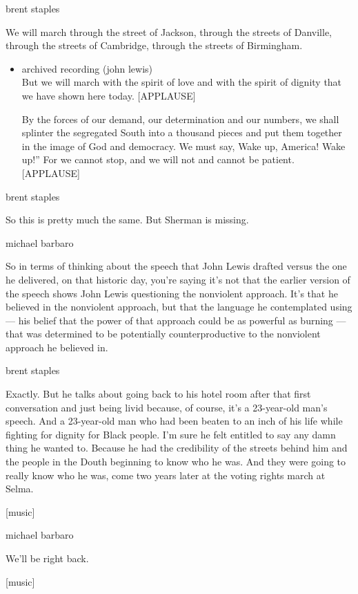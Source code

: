 brent staples

We will march through the street of Jackson, through the streets of
Danville, through the streets of Cambridge, through the streets of
Birmingham.

\begin{itemize}
\item
  archived recording (john lewis)\\
  But we will march with the spirit of love and with the spirit of
  dignity that we have shown here today. {[}APPLAUSE{]}

  By the forces of our demand, our determination and our numbers, we
  shall splinter the segregated South into a thousand pieces and put
  them together in the image of God and democracy. We must say, Wake up,
  America! Wake up!'' For we cannot stop, and we will not and cannot be
  patient. {[}APPLAUSE{]}
\end{itemize}

brent staples

So this is pretty much the same. But Sherman is missing.

michael barbaro

So in terms of thinking about the speech that John Lewis drafted versus
the one he delivered, on that historic day, you're saying it's not that
the earlier version of the speech shows John Lewis questioning the
nonviolent approach. It's that he believed in the nonviolent approach,
but that the language he contemplated using --- his belief that the
power of that approach could be as powerful as burning --- that was
determined to be potentially counterproductive to the nonviolent
approach he believed in.

brent staples

Exactly. But he talks about going back to his hotel room after that
first conversation and just being livid because, of course, it's a
23-year-old man's speech. And a 23-year-old man who had been beaten to
an inch of his life while fighting for dignity for Black people. I'm
sure he felt entitled to say any damn thing he wanted to. Because he had
the credibility of the streets behind him and the people in the Douth
beginning to know who he was. And they were going to really know who he
was, come two years later at the voting rights march at Selma.

{[}music{]}

michael barbaro

We'll be right back.

{[}music{]}

